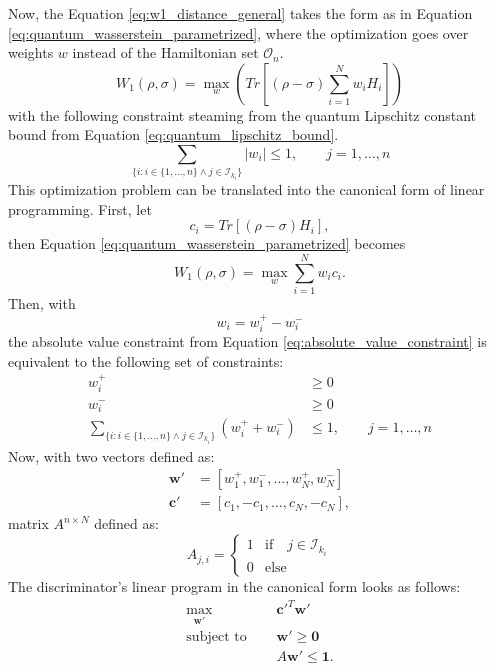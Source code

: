 Now, the Equation \eqref{eq:w1_distance_general} takes the form as in Equation
\eqref{eq:quantum_wasserstein_parametrized}, where the optimization goes over
weights $w$ instead of the Hamiltonian set $\mathcal{O}_n$.
\begin{equation}
  \label{eq:quantum_wasserstein_parametrized}
  W_1(\rho, \sigma) = \max_{w}{(Tr[(\rho - \sigma)\sum_{i=1}^N w_iH_i])}
\end{equation}
with the following constraint steaming from the quantum Lipschitz constant bound
from Equation \eqref{eq:quantum_lipschitz_bound}.
\begin{equation}
  \label{eq:absolute_value_constraint}
\sum_{\{i: i \in \{1,\ldots, n\} \land j \in \mathcal{I}_{k_i} \}} |w_i| \leq 1, \qquad j=1,\ldots,n
\end{equation}
This optimization problem can be translated into the canonical form of linear
programming. First, let
\begin{equation}
  c_i=Tr[(\rho - \sigma)H_i],
\end{equation}  
  then Equation \ref{eq:quantum_wasserstein_parametrized} becomes
\begin{equation}
  W_1(\rho, \sigma) = \max_{w}{\sum_{i=1}^N w_ic_i}.
\end{equation}  
Then, with
\begin{equation}
    w_i = w_i^+ - w_i^-
\end{equation}
the absolute value constraint from Equation \ref{eq:absolute_value_constraint} is equivalent to the following set of
constraints: 
\begin{equation}
\begin{split}
  w_i^+ &\ge 0 \\
  w_i^- &\ge 0 \\
  \sum_{\{i: i \in \{1,\ldots, n\} \land j \in \mathcal{I}_{k_i} \}} (w_i^+ + w_i^-) &\leq 1, \qquad j=1,\ldots,n
\end{split}
\end{equation}
Now, with two vectors defined as:
\begin{equation}
\begin{split}
\bm{w'} &= [w_1^+, w_1^-, \ldots, w_N^+, w_N^-] \\
\bm{c'} &= [c_1, -c_1, \ldots, c_N, -c_N],
\end{split}
\end{equation}
matrix $A^{n \times N}$ defined as:
\[A_{j, i}  = \begin{cases} 
    1 & \text{if} \quad j \in \mathcal{I}_{k_i} \\
    0 & \text{else}
  \end{cases}
\]
The discriminator's linear program in the canonical form looks as follows:
\begin{equation}
\begin{split}
  \max_{\bm{w'}}{} \quad & \bm{c'}^T \bm{w'}\\
  \text{subject to } \quad & \bm{w'} \geq \bm{0} \\
  & A\bm{w'} \leq \bm{1}.
\end{split}
\end{equation}

